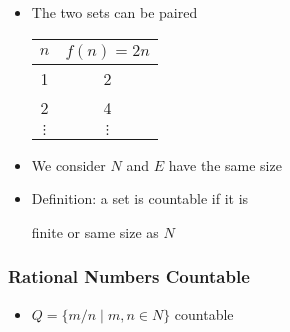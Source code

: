 \begin{frame}[allowframebreaks]
\begin{itemize}
\item The two sets can be paired
  \begin{center}
    \begin{tabular}{cc}
$n$ & $f(n)=2n$\\ \hline
1 & 2 \\
2 & 4 \\
$\vdots$ & $\vdots$
    \end{tabular}
  \end{center}
\item We consider $N$ and $E$ have \alert{the same size}
\item Definition: a set is countable if it is 
  \begin{center}
finite or same size as $N$
\end{center}
\end{itemize}\end{frame} \begin{frame}[allowframebreaks] \frametitle{Rational Numbers Countable}
  \begin{itemize}
\item $Q=\{m/n
\mid m,n \in N\}$ countable



\end{itemize}
\end{frame}
